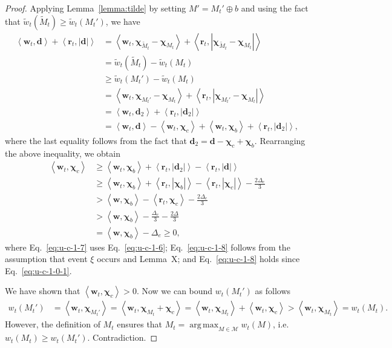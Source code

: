 \documentclass{article}
\newcommand{\M}{\mathcal M}
\DeclareMathOperator*{\argmax}{arg\,max}
\newcommand{\inn}[1]{\left\langle #1 \right\rangle}
\renewcommand{\vec}[1]{\boldsymbol{#1}}
\begin{document}
\begin{spacing}{1.1}
\begin{proof}
Applying Lemma~\ref{lemma:tilde} by setting $M' = M_t' \oplus b$ and using the fact that $\tilde w_t(\tilde M_t) \ge \tilde w_t(M_t')$, we have 
\begin{align*}
\inn{\vec w_t, \vec d}+\inn{\vec r_t, |\vec d|}
& = \inn{\vec w_t, \vec \chi_{\tilde M_t}-\vec\chi_{M_t}}+\inn{\vec r_t, |\vec \chi_{\tilde M_t}-\vec\chi_{M_t}|}\\
& = \tilde w_t(\tilde M_t)- \tilde w_t(M_t)\\
& \ge \tilde w_t(M_t') - \tilde w_t(M_t)\\
&= \inn{\vec w_t, \vec \chi_{M_t'}-\vec\chi_{M_t}}+\inn{\vec r_t, |\vec \chi_{M_t'}-\vec\chi_{M_t}|}\\
&= \inn{\vec w_t, \vec d_2}+\inn{\vec r_t, |\vec d_2|} \\
									  &= \inn{\vec w_t, \vec d}-\inn{\vec w_t, \vec \chi_c}+\inn{\vec w_t,\vec\chi_b}+\inn{\vec r_t, |\vec d_2|},
\end{align*}
where the last equality follows from the fact that $\vec d_2 = \vec d-\vec \chi_{c}+\vec \chi_{b}$.
Rearranging the above inequality, we obtain
\begin{align}
\inn{\vec w_t, \vec \chi_c} &\ge \inn{\vec w_t, \vec \chi_b}+\inn{\vec r_t, |\vec d_2|}-\inn{\vec r_t, |\vec d|}\nonumber \\
&\ge  \inn{\vec w_t, \vec \chi_b}+
\left\langle \vec r_t, |\vec\chi_b| \right\rangle
  -\left\langle \vec r_t, |\vec\chi_c| \right\rangle
  -\frac{2\Delta_e}{3} \label{eq:u-c-1-7}\\
&> \inn{\vec w, \vec \chi_b}-\inn{\vec r_t, \vec \chi_c}-\frac{2\Delta_e}{3} \label{eq:u-c-1-8}\\
&> \inn{\vec w, \vec \chi_b}-\frac{\Delta_e}{3}-\frac{2\Delta}{3} \label{eq:u-c-1-9}\\
&= \inn{\vec w, \vec \chi_b}-\Delta_e \ge 0,
\end{align}
where Eq.~\eqref{eq:u-c-1-7} uses Eq.~\eqref{eq:u-c-1-6}; 
Eq.~\eqref{eq:u-c-1-8} follows from the assumption that event $\xi$ occurs and Lemma~X;
and Eq.~\eqref{eq:u-c-1-8} holds since Eq.~\eqref{eq:u-c-1-0-1}.

We have shown that $\inn{\vec w_t,\vec \chi_c}>0$. Now we can bound $w_t(M_t')$ as follows
\begin{align*}
 w_t(M_t') &= \inn{\vec w_t, \vec \chi_{M_t'}} = \inn{\vec w_t, \vec \chi_{M_t}+\vec \chi_c} =
 \inn{\vec w_t, \vec \chi_{M_t}}+\inn{\vec w_t, \vec \chi_c} > \inn{\vec w_t, \vec \chi_{M_t}} = w_t(M_t).
\end{align*}
However, the definition of $M_t$ ensures that $M_t = \argmax_{M\in\M} w_t(M)$, i.e. $w_t(M_t) \ge w_t(M_t')$. Contradiction.


\end{proof}
\end{spacing}
\end{document}
